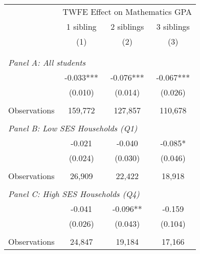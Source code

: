 \makeatletter
{}
{
\makeatother
\begin{tabular}{lccc}
\toprule
\cmidrule(lr){2-4}
& \multicolumn{3}{c}{TWFE Effect on Mathematics GPA} \\
\cmidrule(lr){2-4}
& 1 sibling & 2 siblings & 3 siblings  \\
\cmidrule(lr){2-2} \cmidrule(lr){3-3} \cmidrule(lr){4-4}
& (1) & (2) & (3)\\
\bottomrule
&  &  &  \\
&  &  &   \\
\multicolumn{4}{l}{\textit{Panel A: All students}} \\
\hspace{3mm}        &      -0.033***&      -0.076***&      -0.067***\\
                    &     (0.010)   &     (0.014)   &     (0.026)   \\
                    &               &               &               \\
\hspace{3mm}Observations&     159,772   &     127,857   &     110,678   \\
 
&  &  &   \\
\multicolumn{4}{l}{\textit{Panel B: Low SES Households (Q1)}} \\
\hspace{3mm}        &      -0.021   &      -0.040   &      -0.085*  \\
                    &     (0.024)   &     (0.030)   &     (0.046)   \\
                    &               &               &               \\
\hspace{3mm}Observations&      26,909   &      22,422   &      18,918   \\
 
&  &  &   \\
\multicolumn{4}{l}{\textit{Panel C: High SES Households (Q4)}} \\
\hspace{3mm}        &      -0.041   &      -0.096** &      -0.159   \\
                    &     (0.026)   &     (0.043)   &     (0.104)   \\
                    &               &               &               \\
\hspace{3mm}Observations&      24,847   &      19,184   &      17,166   \\
 

\end{tabular}}
